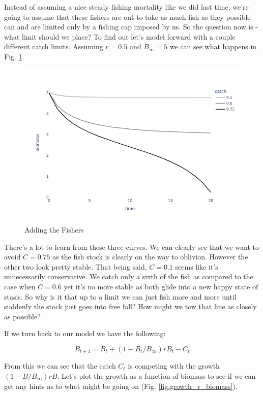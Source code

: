 \documentclass[11pt,a5paper]{book}
\begin{document}
Instead of assuming a nice steady fishing mortality like we did last time, we're going to assume that these fishers are out to take as much fish as they possible can and are limited only by a fishing cap imposed by us. So the question now is - what limit should we place? To find out let's model forward with a couple different catch limits. Assuming $r=0.5$ and $B_\infty=5$ we can see what happens in Fig. \ref{fig:adding_the_fishers}.
\newline

\begin{figure}[h!] 
  \includegraphics[width=\linewidth]{notebooks/SurplusModels/adding_the_humans.png}
  \caption{Adding the Fishers}
  \label{fig:adding_the_fishers}
\end{figure}

There's a lot to learn from these three curves. We can clearly see that we want to avoid $C=0.75$ as the fish stock is clearly on the way to oblivion. However the other two look pretty stable. That being said, $C=0.1$ seems like it's unnecessarily conservative. We catch only a sixth of the fish as compared to the case when $C=0.6$ yet it's no more stable as both glide into a new happy state of stasis. So why is it that up to a limit we can just fish more and more until suddenly the stock just goes into free fall? How might we tow that line as closely as possible?
\newline

If we turn back to our model we have the following:

$$B_{t+1} = B_t + (1 - B_t/B_\infty)rB_t - C_t$$

From this we can see that the catch $C_t$ is competing with the growth $(1 - B/B_\infty)rB$. Let's plot the growth as a function of biomass to see if we can get any hints as to what might be going on (Fig. \ref{fig:growth_v_biomass}).
\newline
\end{document}
